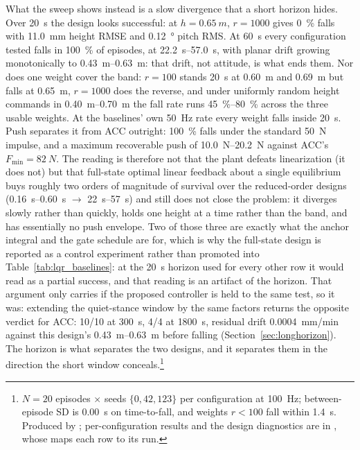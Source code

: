 \documentclass[a4paper,fleqn]{cas-dc}
\begin{document}
What the sweep shows instead is a slow divergence that a short horizon hides. Over \SI{20}{s} the design looks successful: at $h{=}\SI{0.65}{m}$, $r{=}1000$ gives \SI{0}{\percent} falls with \SI{11.0}{mm} height RMSE and \SI{0.12}{\degree} pitch RMS. At \SI{60}{s} every configuration tested falls in \SI{100}{\percent} of episodes, at \SIrange{22.2}{57.0}{s}, with planar drift growing monotonically to \SIrange{0.43}{0.63}{m}: that drift, not attitude, is what ends them. Nor does one weight cover the band: $r{=}100$ stands \SI{20}{s} at \SI{0.60}{m} and \SI{0.69}{m} but falls at \SI{0.65}{m}, $r{=}1000$ does the reverse, and under uniformly random height commands in \SIrange{0.40}{0.70}{m} the fall rate runs \SIrange{45}{80}{\percent} across the three usable weights. At the baselines' own \SI{50}{Hz} rate every weight falls inside \SI{20}{s}. Push separates it from ACC outright: \SI{100}{\percent} falls under the standard \SI{50}{N} impulse, and a maximum recoverable push of \SIrange{10.0}{20.2}{N} against ACC's $F_{\min}{=}\SI{82}{N}$. The reading is therefore not that the plant defeats linearization (it does not) but that full-state optimal linear feedback about a single equilibrium buys roughly two orders of magnitude of survival over the reduced-order designs (\SIrange{0.16}{0.60}{s} $\rightarrow$ \SIrange{22}{57}{s}) and still does not close the problem: it diverges slowly rather than quickly, holds one height at a time rather than the band, and has essentially no push envelope. Two of those three are exactly what the anchor integral and the gate schedule are for, which is why the full-state design is reported as a control experiment rather than promoted into Table~\ref{tab:lqr_baselines}: at the \SI{20}{s} horizon used for every other row it would read as a partial success, and that reading is an artifact of the horizon. That argument only carries if the proposed controller is held to the same test, so it was: extending the quiet-stance window by the same factors returns the opposite verdict for ACC: \num{10}/\num{10} at \SI{300}{s}, \num{4}/\num{4} at \SI{1800}{s}, residual drift \SI{0.0004}{mm/min} against this design's \SIrange{0.43}{0.63}{m} before falling (Section~\ref{sec:longhorizon}). The horizon is what separates the two designs, and it separates them in the direction the short window conceals.\footnote{$N{=}20$ episodes $\times$ seeds $\{0,42,123\}$ per configuration at \SI{100}{Hz}; between-episode SD is \SI{0.00}{s} on time-to-fall, and weights $r{<}100$ fall within \SI{1.4}{s}. Produced by ; per-configuration results and the design diagnostics are in , whose  maps each row to its run.}
\end{document}
